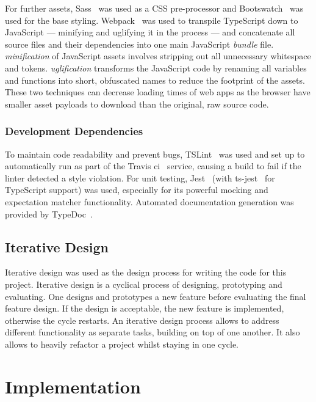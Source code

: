 \documentclass[nobib, a4paper, twoside, justified]{tufte-book}
\begin{document}
For further assets, Sass~\autocite{sass-lang} was used as a CSS pre-processor and
Bootswatch~\autocite{bootswatch-flatly} was used for the base styling.  Webpack~\autocite{webpack}
was used to \gls{transpile} TypeScript down to JavaScript --- minifying and uglifying it in the
process --- and concatenate all source files and their dependencies into one main JavaScript
\textit{bundle} file. \textit{\Gls{minification}} of JavaScript assets involves stripping out all
unnecessary whitespace and tokens. \textit{\Gls{uglification}} transforms the JavaScript code by
renaming all variables and functions into short, obfuscated names to reduce the footprint of the
assets. These two techniques can decrease loading times of web apps as the browser have smaller
asset payloads to download than the original, raw source code.

\subsection{Development Dependencies}%
\label{sub:development_dependencies}

To maintain code readability and prevent bugs, TSLint~\autocite{tslint} was used and set up to
automatically run as part of the Travis \gls{ci}~\autocite{travis} service, causing a build to fail
if the linter detected a style violation. For unit testing, Jest~\autocite{jest} (with
ts-jest~\autocite{ts-jest} for TypeScript support) was used, especially for its powerful mocking
and expectation matcher functionality. Automated documentation generation was provided by
TypeDoc~\autocite{typedoc}.

\section{Iterative Design}%
\label{sec:iterative_design}

Iterative design was used as the design process for writing the code for this project. Iterative
design is a cyclical process of designing, prototyping and evaluating. One designs and prototypes a
new feature before evaluating the final feature design. If the design is acceptable, the new
feature is implemented, otherwise the cycle restarts. An iterative design process allows to address
different functionality as separate tasks, building on top of one another. It also allows to
heavily refactor a project whilst staying in one cycle.

\chapter{Implementation}%
\label{cha:implementation}
\end{document}
